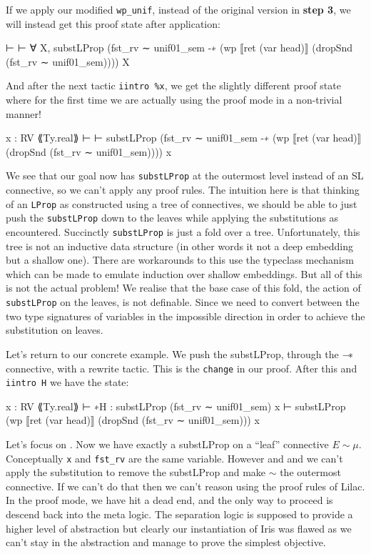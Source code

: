 If we apply our modified \texttt{wp\_unif}, instead of the original version in \textbf{step 3}, we will instead get this proof state after application:

\begin{leancode}
⊢ 
⊢ ∀ X, substLProp (fst_rv ∼ unif01_sem -∗
    (wp ⟦ret (var head)⟧ (dropSnd (fst_rv ∼ unif01_sem)))) X
\end{leancode}

And after the next tactic \texttt{iintro \%x}, we get the slightly different proof state where for the first time we are actually using the proof mode in a non-trivial manner!
\begin{leancode}
x : RV ⟪Ty.real⟫
⊢ 
⊢ substLProp (fst_rv ∼ unif01_sem -∗ (wp ⟦ret (var head)⟧ (dropSnd (fst_rv ∼ unif01_sem)))) x
\end{leancode}

We see that our goal now has \texttt{substLProp} at the outermost level instead of an SL connective, so we can't apply any proof rules. The intuition here is that
thinking of an \texttt{LProp} as constructed using a tree of connectives, we should be able to just push the \texttt{substLProp} down to the leaves while applying the substitutions as encountered.
Succinctly \texttt{substLProp} is just a fold over a tree. Unfortunately, this tree is not an inductive data structure (in other words it not a deep embedding but a shallow one).
There are workarounds to this use the typeclass mechanism which can be made to emulate induction over shallow embeddings. But all of this is not the actual problem!
We realise that the base case of this fold, the action of \texttt{substLProp} on the leaves, is not definable. Since we need to convert between the two type signatures of variables
in the impossible direction in order to achieve the substitution on leaves.

Let's return to our concrete example. We push the substLProp, through the $\mathbin{-\!*}$ connective, with a rewrite tactic. This is the \texttt{change} in our proof. After this
and \texttt{iintro H} we have the state:

\begin{leancode}
x : RV ⟪Ty.real⟫
⊢ ∗H : substLProp (fst_rv ∼ unif01_sem) x
⊢ substLProp (wp ⟦ret (var head)⟧ (dropSnd (fst_rv ∼ unif01_sem))) x
\end{leancode}

Let's focus on . Now we have exactly a substLProp on a ``leaf'' connective $E \sim \mu$. Conceptually \texttt{x} and \texttt{fst\_rv}
are the same variable. However  and  and we can't apply the substitution to remove the substLProp and make $\sim$ the 
outermost connective. If we can't do that then we can't reason using the proof rules of Lilac. In the proof mode, we have hit a dead end, and the only way to proceed is
descend back into the meta logic. The separation logic is supposed to provide a higher level of abstraction but clearly our instantiation of Iris was flawed as we can't stay
in the abstraction and manage to prove the simplest objective.

